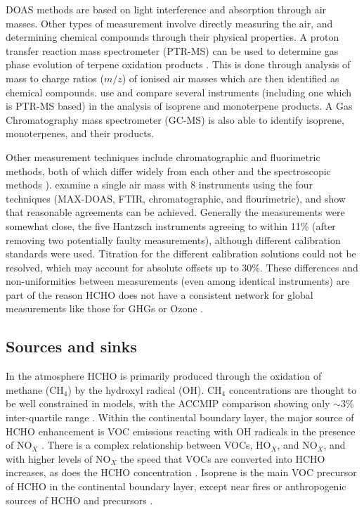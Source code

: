     DOAS methods are based on light interference and absorption through air masses.
    Other types of measurement involve directly measuring the air, and determining chemical compounds through their physical properties.
    A proton transfer reaction mass spectrometer (PTR-MS) can be used to determine gas phase evolution of terpene oxidation products \citep[eg.]{Lee2006a,Nguyen2014,Wolfe2016}.
    This is done through analysis of mass to charge ratios ($m/z$) of ionised air masses which are then identified as chemical compounds.
    \cite{Nguyen2014} use and compare several instruments (including one which is PTR-MS based) in the analysis of isoprene and monoterpene products.
    A Gas Chromatography mass spectrometer (GC-MS) is also able to identify isoprene, monoterpenes, and their products.
    
    Other measurement techniques include chromatographic and fluorimetric methods, both of which differ widely from each other and the spectroscopic methods \citep{Hak2005}).
    \cite{Hak2005} examine a single air mass with 8 instruments using the four techniques (MAX-DOAS, FTIR, chromatographic, and flourimetric), and show that reasonable agreements can be achieved.
    Generally the measurements were somewhat close, the five Hantzsch instruments agreeing to within 11\% (after removing two potentially faulty measurements), although different calibration standards were used.
    Titration for the different calibration solutions could not be resolved, which may account for absolute offsets up to 30\%.
    These differences and non-uniformities between measurements (even among identical instruments) are part of the reason HCHO does not have a consistent network for global measurements like those for GHGs or Ozone \citep{FortemsCheiney2012}.
  
  \subsection{Sources and sinks}
    
    In the atmosphere HCHO is primarily produced through the oxidation of methane (CH$_4$) by the hydroxyl radical (OH).
    CH$_4$ concentrations are thought to be well constrained in models, with the ACCMIP comparison showing only $\sim3$\% inter-quartile range \citep{Young2013}.
    Within the continental boundary layer, the major source of HCHO enhancement is VOC emissions reacting with OH radicals in the presence of NO$_X$ \citep{Wagner2002, Millet2006, Kefauver2014}.
    There is a complex relationship between VOCs, HO$_X$, and NO$_X$, and with higher levels of NO$_X$ the speed that VOCs are converted into HCHO increases, as does the HCHO concentration \citep{Wolfe2016}.
    Isoprene is the main VOC precursor of HCHO in the continental boundary layer, except near fires or anthropogenic sources of HCHO and precursors \citep{Guenther1995, Kefauver2014, Wolfe2016}.
    
